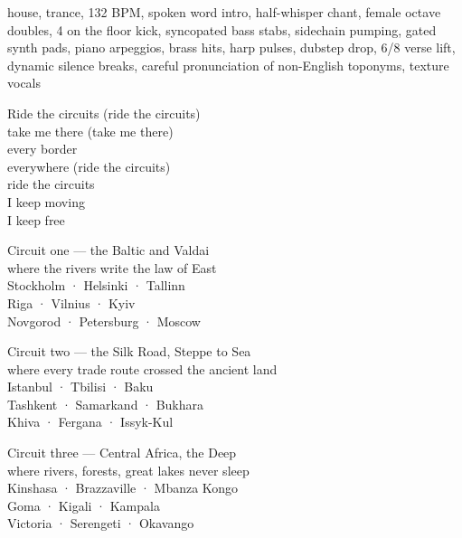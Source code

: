 
\begin{notes}
\end{notes}
\begin{style}
house, trance, 132 BPM, spoken word intro, half-whisper chant, female octave doubles, 4 on the floor kick, syncopated bass stabs, sidechain pumping, gated synth pads, piano arpeggios, brass hits, harp pulses, dubstep drop, 6/8 verse lift, dynamic silence breaks, careful pronunciation of non-English toponyms, texture vocals
\end{style}
\begin{lyrics}
Ride the circuits
(ride the circuits)\\
take me there
(take me there)\\
every border\\
everywhere
(ride the circuits)\\
ride the circuits\\
I keep moving\\
I keep free


Circuit one — the Baltic and Valdai\\
where the rivers write the law of East
\\
Stockholm · Helsinki · Tallinn\\
Riga · Vilnius · Kyiv\\
Novgorod · Petersburg · Moscow

Circuit two — the Silk Road, Steppe to Sea\\
where every trade route crossed the ancient land 
\\
Istanbul · Tbilisi · Baku\\
Tashkent · Samarkand · Bukhara\\
Khiva · Fergana · Issyk-Kul


Circuit three — Central Africa, the Deep\\
where rivers, forests, great lakes never sleep
\\
Kinshasa · Brazzaville · Mbanza Kongo\\
Goma · Kigali · Kampala\\
Victoria · Serengeti · Okavango


\end{lyrics}
